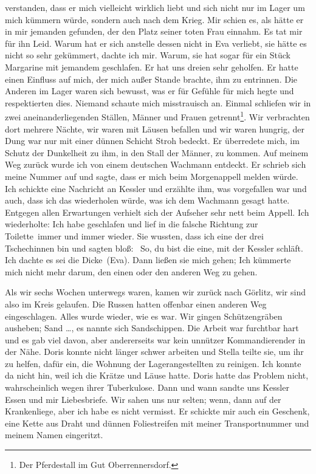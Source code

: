 verstanden, dass er mich vielleicht wirklich liebt und sich nicht nur im Lager um mich kümmern würde, sondern auch nach dem Krieg. Mir schien es, als hätte er in mir jemanden gefunden, der den Platz seiner toten Frau einnahm. Es tat mir für ihn Leid. Warum hat er sich anstelle dessen nicht in Eva verliebt, sie hätte es nicht so sehr gekümmert, dachte ich mir. Warum, sie hat sogar für ein Stück Margarine mit jemandem geschlafen. Er hat uns dreien sehr geholfen. Er hatte einen Einfluss auf mich, der mich außer Stande brachte, ihm zu entrinnen. Die Anderen im Lager waren sich bewusst, was er für Gefühle für mich hegte und respektierten dies. Niemand schaute mich misstrauisch an. Einmal schliefen wir in zwei aneinanderliegenden Ställen, Männer und Frauen getrennt\footnote{Der Pferdestall im Gut Oberrennersdorf.}. Wir verbrachten dort mehrere Nächte, wir waren mit Läusen befallen und wir waren hungrig, der Dung war nur mit einer dünnen Schicht Stroh bedeckt. Er überredete mich, im Schutz der Dunkelheit zu ihm, in den Stall der Männer, zu kommen. Auf meinem Weg zurück wurde ich von einem deutschen Wachmann entdeckt. Er schrieb sich meine Nummer auf und sagte, dass er mich beim Morgenappell melden würde. Ich schickte eine Nachricht an Kessler und erzählte ihm, was vorgefallen war und auch, dass ich das wiederholen würde, was ich dem Wachmann gesagt hatte. Entgegen allen Erwartungen verhielt sich der Aufseher sehr nett beim Appell. Ich wiederholte: \glqq Ich habe geschlafen und lief in die falsche Richtung zur Toilette\grqq~immer und immer wieder. Sie wussten, dass ich eine der drei Tschechinnen bin und sagten bloß: \glqq~So, du bist die eine, mit der Kessler schläft. Ich dachte es sei die Dicke\grqq~(Eva). Dann ließen sie mich gehen; Ich kümmerte mich nicht mehr darum, den einen oder den anderen Weg zu gehen.

Als wir sechs Wochen unterwegs waren, kamen wir zurück nach Görlitz, wir sind also im Kreis gelaufen. Die Russen hatten offenbar einen anderen Weg eingeschlagen. Alles wurde wieder, wie es war. Wir gingen Schützengräben ausheben; Sand \dots, es nannte sich \glqq Sandschippen\grqq. Die Arbeit war furchtbar hart und es gab viel davon, aber andererseits war kein unnützer Komman\-dier\-ender in der Nähe. Doris konnte nicht länger schwer arbeiten und Stella teilte sie, um ihr zu helfen, dafür ein, die Wohnung der Lagerangestellten zu reinigen. Ich konnte da nicht hin, weil ich die Krätze und Läuse hatte. Doris hatte das Problem nicht, wahrscheinlich wegen ihrer Tuberkulose. Dann und wann sandte uns Kessler Essen und mir Liebesbriefe. Wir sahen uns nur selten; wenn, dann auf der Krankenliege, aber ich habe es nicht vermisst. Er schickte mir auch ein Geschenk, eine Kette aus Draht und dünnen Foliestreifen mit meiner Transportnummer und meinem Namen eingeritzt.

